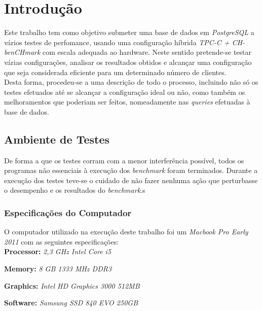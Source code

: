 \section{Introdução}

Este trabalho tem como objetivo submeter uma base de dados em \textit{PostgreSQL} a vários testes de perfomance, usando uma configuração híbrida \textit{TPC-C + CH-benCHmark} com escala adequada ao hardware. Neste sentido pretende-se testar várias configurações, analisar os resultados obtidos e alcançar uma configuração que seja considerada eficiente para um determinado número de clientes.\\

Desta forma, procedeu-se a uma descrição de todo o processo, incluindo não só os testes efetuados até se alcançar a configuração ideal ou não, como também os melhoramentos que poderiam ser feitos, nomeadamente nas \textit{queries} efetuadas à base de dados.\\

\subsection{Ambiente de Testes}

De forma a que os testes corram com a menor interferência possível, todos os programas não essenciais à execução dos \textit{benchmark} foram terminados. Durante a execução dos testes teve-se o cuidado de não fazer nenhuma ação que perturbasse o desempenho e os resultados do \textit{benchmark}.s

\subsubsection{Especificações do Computador}

O computador utilizado na execução deste trabalho foi um \textit{Macbook Pro Early 2011} com as seguintes especificações:\\

\textbf{Processor:} \textit{2,3 GHz Intel Core i5}

\textbf{Memory:} \textit{8 GB 1333 MHz DDR3}

\textbf{Graphics:} \textit{Intel HD Graphics 3000 512MB}

\textbf{Software:} \textit{Samsung SSD 840 EVO 250GB}
